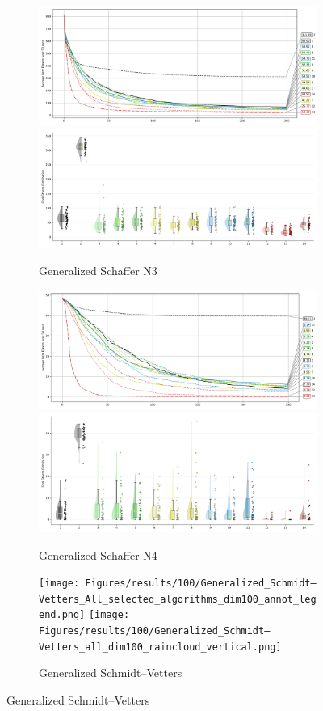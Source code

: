 \begin{figure}[p]\ContinuedFloat
\renewcommand\thesubfigure{C.\arabic{figure}.\arabic{subfigure}} %

    \centering

\begin{subfigure}{1\textwidth}
    \centering
    \includegraphics[width=.49\textwidth]{Figures/results/100/Generalized_Schaffer_N3_All_selected_algorithms_dim100_annot_legend.png}
    \includegraphics[width=.49\textwidth]{Figures/results/100/Generalized_Schaffer_N3_all_dim100_raincloud_vertical.png}
    \caption{Generalized Schaffer N3}
\end{subfigure}

\begin{subfigure}{1\textwidth}
    \centering
    \includegraphics[width=.49\textwidth]{Figures/results/100/Generalized_Schaffer_N4_All_selected_algorithms_dim100_annot_legend.png}
    \includegraphics[width=.49\textwidth]{Figures/results/100/Generalized_Schaffer_N4_all_dim100_raincloud_vertical.png}
    \caption{Generalized Schaffer N4}
\end{subfigure}

\begin{subfigure}{1\textwidth}
    \centering
    \texttt{[image: Figures/results/100/Generalized\_Schmidt–Vetters\_All\_selected\_algorithms\_dim100\_annot\_legend.png]}
    \texttt{[image: Figures/results/100/Generalized\_Schmidt–Vetters\_all\_dim100\_raincloud\_vertical.png]}
    \caption{Generalized Schmidt–Vetters}
\end{subfigure}


\end{figure}
